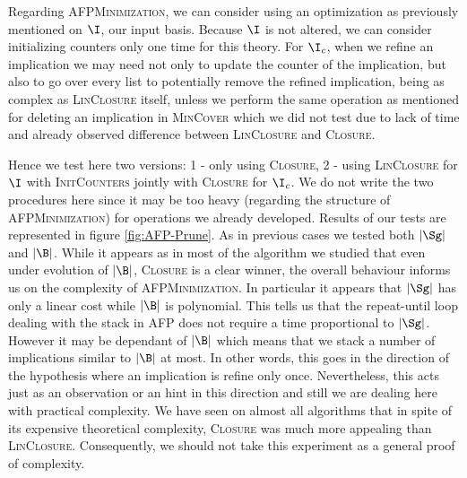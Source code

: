 Regarding \textsc{AFPMinimization}, we can consider using an optimization as
previously mentioned on $\I$, our input basis. Because $\I$ is not altered, we can consider initializing counters only one time for this theory. For $\I_c$, when we refine an implication we may need not only to update the counter of 
the implication, but also to go over every list to potentially remove the
refined implication, being as complex as \textsc{LinClosure} itself, unless we 
perform the same operation as mentioned for deleting an implication in \textsc{MinCover} which we did not test due to lack of time and already observed difference between \textsc{LinClosure} and \textsc{Closure}. 

\vspace{1.2em}

Hence we test here two versions: 1 - only using \textsc{Closure}, 2 - using
\textsc{LinClosure} for $\I$ with \textsc{InitCounters} jointly with 
\textsc{Closure} for $\I_c$. We do not write the two procedures here since
it may be too heavy (regarding the structure of \textsc{AFPMinimization}) for operations we already developed. Results of our tests are represented in 
figure \ref{fig:AFP-Prune}. As in previous cases we tested both $|\Sg|$ and
$|\B|$. While it appears as in most of the algorithm we studied that even
under evolution of $|\B|$, \textsc{Closure} is a clear winner, the overall
behaviour informs us on the complexity of \textsc{AFPMinimization}. In particular it appears that $|\Sg|$ has only a linear cost while $|\B|$ is
polynomial. This tells us that the repeat-until loop dealing with the stack
in \textsc{AFP} does not require a time proportional to $|\Sg|$. However it
may be dependant of $|\B|$ which means that we stack a number of implications
similar to $|\B|$ at most. In other words, this goes in the direction of the 
hypothesis where an implication is refine only once. Nevertheless, this acts
just as an observation or an hint in this direction and still we are dealing
here with practical complexity. We have seen on almost all algorithms that
in spite of its expensive theoretical complexity, \textsc{Closure} was much
more appealing than \textsc{LinClosure}. Consequently, we should not take
this experiment as a general proof of complexity. 

\vspace{1.2em}


